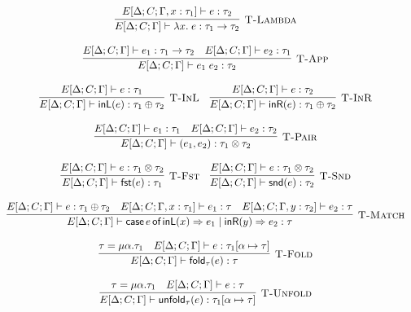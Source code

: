 \begin{figure}
\[\begin{array}{c}
      \\\\
      \labinfer[T-Lambda]{E[\Delta;C;\Gamma] \vdash \lambda x.\; e : \tau_1 \ra \tau_2}
        {E[\Delta;C;\Gamma, x : \tau_1] \vdash e : \tau_2}
      \\\\
      \labinfer[T-App]{E[\Delta;C;\Gamma] \vdash e_1\; e_2 : \tau_2}
        {E[\Delta;C;\Gamma] \vdash e_1 : \tau_1 \ra \tau_2
        &E[\Delta;C;\Gamma] \vdash e_2 : \tau_1}
      \\\\
      \labinfer[T-InL]{E[\Delta;C;\Gamma] \vdash \inL(e) : \tau_1 \Either \tau_2}{E[\Delta;C;\Gamma] \vdash e : \tau_1}
      ~~~
      \labinfer[T-InR]{E[\Delta;C;\Gamma] \vdash \inR(e) : \tau_1 \Either \tau_2}{E[\Delta;C;\Gamma] \vdash e : \tau_2}
      \\\\
      \labinfer[T-Pair]{E[\Delta;C;\Gamma] \vdash (e_1, e_2) : \tau_1 \Pair \tau_2}{E[\Delta;C;\Gamma] \vdash e_1 : \tau_1 & E[\Delta;C;\Gamma] \vdash e_2 : \tau_2}
      \\\\
      \labinfer[T-Fst]{E[\Delta;C;\Gamma] \vdash \fst(e) : \tau_1}{E[\Delta;C;\Gamma] \vdash e : \tau_1 \Pair \tau_2}
      ~~~
      \labinfer[T-Snd]{E[\Delta;C;\Gamma] \vdash \snd(e) : \tau_2}{E[\Delta;C;\Gamma] \vdash e : \tau_1 \Pair \tau_2}
      \\\\
      \labinfer[T-Match]{E[\Delta;C;\Gamma] \vdash \matchWith{e} \inL(x) \Ra e_1 \mid \inR(y) \Ra e_2 : \tau}
        {E[\Delta;C;\Gamma] \vdash e : \tau_1 \Either \tau_2
        &E[\Delta;C;\Gamma, x : \tau_1] \vdash e_1 : \tau
        &E[\Delta;C;\Gamma, y : \tau_2] \vdash e_2 : \tau}
      \\\\
      \labinfer[T-Fold]{E[\Delta;C;\Gamma] \vdash \fold_\tau(e) : \tau}
        {\tau = \mu\alpha.\tau_1 & E[\Delta;C;\Gamma] \vdash e : \tau_1[\alpha\mapsto\tau]}
      \\\\
      \labinfer[T-Unfold]{E[\Delta;C;\Gamma] \vdash \unfold_\tau(e) : \tau_1[\alpha\mapsto\tau]}
        {\tau = \mu\alpha.\tau_1 & E[\Delta;C;\Gamma] \vdash e : \tau}


\end{array}\]
\end{figure}
